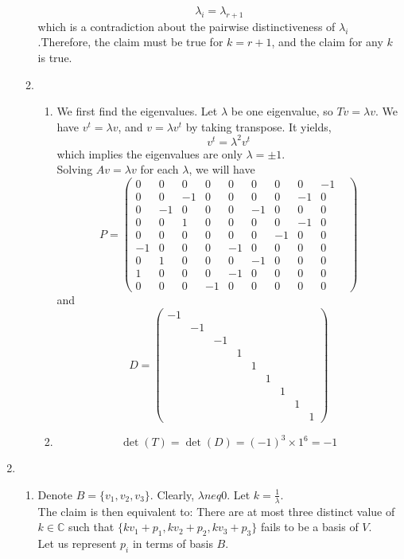 \documentclass[12pt]{article}
\theoremstyle{definition}
\begin{document}
\begin{enumerate}
\begin{enumerate}
  \[
\lambda_i = \lambda_{r+1}
  \]
  which is a contradiction about the pairwise distinctiveness of $\lambda_i$.Therefore, the claim must be true for $k=r+1$, and the claim for any $k$ is true.
  \item \begin{enumerate}
  \item We first find the eigenvalues. Let $\lambda$ be one eigenvalue, so $Tv = \lambda v$. We have $v^t = \lambda v$, and $v = \lambda v^t$ by taking transpose. It yields,
  \[
v^t = \lambda^2 v^t
  \]
  which implies the eigenvalues are only $\lambda = \pm 1$.\\Solving $Av=\lambda v$ for each $\lambda$, we will have
\[
P = \begin{pmatrix}
0&0&0&0&0&0&0&0&-1\\
0&0&-1&0&0&0&0&-1&0\\
0&-1&0&0&0&-1&0&0&0&\\
0&0&1&0&0&0&0&-1&0\\
0&0&0&0&0&0&-1&0&0&\\
-1&0&0&0&-1&0&0&0&0\\
0&1&0&0&0&-1&0&0&0\\
1&0&0&0&-1&0&0&0&0\\
0&0&0&-1&0&0&0&0&0
\end{pmatrix}
\]
and
\[
D=\begin{pmatrix}
-1&&&&&&&&\\
&-1&&&&&&&\\
&&-1&&&&&&\\
&&&1&&&&&\\
&&&&1&&&&\\
&&&&&1&&&\\
&&&&&&1&&\\
&&&&&&&1&\\
&&&&&&&&1
\end{pmatrix}
\]
\item 
\[
\det(T)=\det(D) = (-1)^3\times 1^6 = -1
\]
\end{enumerate}
  \end{enumerate}
\item
\begin{enumerate}
  \item Denote $B = \{v_1,v_2,v_3\}$. Clearly, $\lambda neq 0$. Let $k = \frac{1}{\lambda}$.\\The claim is then equivalent to: There are at most three distinct value of $k\in\mathbb{C}$ such that $\{kv_1 + p_1, kv_2 + p_2, kv_3 + p_3\}$ fails to be a basis of $V$.\\
  Let us represent $p_i$ in terms of basis $B$.

\end{enumerate}
\end{enumerate}
\end{document}
